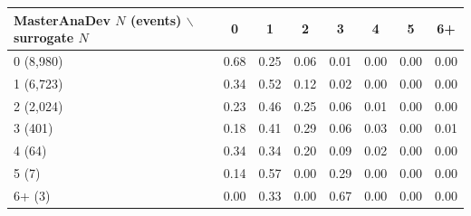 \begin{tabular}{lccccccc}
\toprule
MasterAnaDev $N$ (events) $\backslash$ surrogate $N$ & 0 & 1 & 2 & 3 & 4 & 5 & 6+ \\
\midrule
0 (8,980) & 0.68 & 0.25 & 0.06 & 0.01 & 0.00 & 0.00 & 0.00 \\
1 (6,723) & 0.34 & 0.52 & 0.12 & 0.02 & 0.00 & 0.00 & 0.00 \\
2 (2,024) & 0.23 & 0.46 & 0.25 & 0.06 & 0.01 & 0.00 & 0.00 \\
3 (401) & 0.18 & 0.41 & 0.29 & 0.06 & 0.03 & 0.00 & 0.01 \\
4 (64) & 0.34 & 0.34 & 0.20 & 0.09 & 0.02 & 0.00 & 0.00 \\
5 (7) & 0.14 & 0.57 & 0.00 & 0.29 & 0.00 & 0.00 & 0.00 \\
6+ (3) & 0.00 & 0.33 & 0.00 & 0.67 & 0.00 & 0.00 & 0.00 \\
\bottomrule
\end{tabular}
